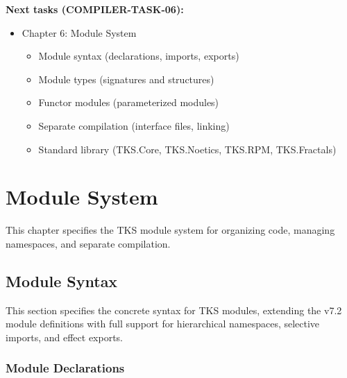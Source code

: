 \begin{tcolorbox}[colback=green!5!white,colframe=green!50!black,title=\textbf{Handoff: COMPILER-TASK-05 Complete},breakable]
\textbf{Next tasks (COMPILER-TASK-06):}
\begin{itemize}
  \item Chapter 6: Module System
    \begin{itemize}
      \item Module syntax (declarations, imports, exports)
      \item Module types (signatures and structures)
      \item Functor modules (parameterized modules)
      \item Separate compilation (interface files, linking)
      \item Standard library (TKS.Core, TKS.Noetics, TKS.RPM, TKS.Fractals)
    \end{itemize}
\end{itemize}
\end{tcolorbox}

\chapter{Module System}
\label{ch:module-system}

\begin{tcolorbox}[colback=blue!5!white,colframe=blue!75!black,title=\vnewthree]
This chapter specifies the TKS module system for organizing code, managing namespaces, and separate compilation.
\end{tcolorbox}

\section{Module Syntax}
\label{sec:module-syntax}

This section specifies the concrete syntax for TKS modules, extending the v7.2 module definitions with full support for hierarchical namespaces, selective imports, and effect exports.

\subsection{Module Declarations}
\label{subsec:module-declarations}

